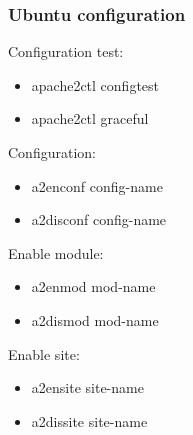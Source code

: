 \begin{frame}[fragile]
        \frametitle{Ubuntu configuration}
Configuration test:
\begin{itemize}
    \item apache2ctl configtest
    \item apache2ctl graceful
\end{itemize}
Configuration:
\begin{itemize}
    \item a2enconf config-name
    \item a2disconf config-name
\end{itemize}
Enable module:
\begin{itemize}
    \item a2enmod mod-name
    \item a2dismod mod-name
\end{itemize}
Enable site:
\begin{itemize}
    \item a2ensite site-name
    \item a2dissite site-name
\end{itemize}
\end{frame}
